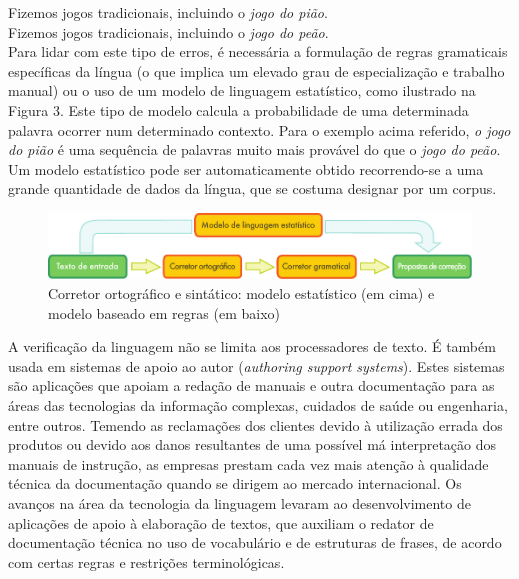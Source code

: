 \begin{multicols}{2}
Fizemos jogos tradicionais, incluindo o \textit{jogo do pião}.\\
Fizemos jogos tradicionais, incluindo o \textit{jogo do peão}.\\

Para lidar com este tipo de erros, é necessária a formulação de regras gramaticais específicas da língua (o que implica um elevado grau de especialização e trabalho manual) ou o uso de um modelo de linguagem estatístico, como ilustrado na Figura 3. Este tipo de modelo calcula a probabilidade de uma determinada palavra ocorrer num determinado contexto. 
Para o exemplo acima referido, \textit{o jogo do pião} é uma sequência de palavras muito mais provável do que o \textit{jogo do peão}. Um mo\-de\-lo estatístico pode ser automaticamente obtido recorrendo-se a uma grande quantidade de dados da língua, que se costuma designar por um corpus.

\begin{figure}[htb]
  \center
  \includegraphics[width=\textwidth]{../_media/portuguese/language_checking}
  \caption{Corretor ortográfico e sintático: modelo estatístico (em cima) e modelo baseado em regras (em baixo)}
  \label{fig:langcheckingaarch_de}
\end{figure}

A verificação da linguagem não se limita aos processadores de texto. 
É também usada em sistemas de apoio ao autor (\textit{authoring support systems}).
Estes sistemas são aplicações que apoiam a redação
de manuais e outra documentação para as áreas das tecnologias da informação complexas, cuidados de saúde ou
engenharia, entre outros.
Temendo as reclamações dos clientes devido à utilização errada dos produtos ou devido aos danos resultantes de uma possível má interpretação dos manuais de instrução, as empresas prestam cada vez mais atenção à qualidade técnica da documentação quando se dirigem ao mercado internacional. 
Os avanços na área da tecnologia da linguagem levaram ao desenvolvimento de aplicações de apoio à elaboração
de textos, que auxiliam o redator de documentação técnica no uso de vocabulário e de estruturas de frases, de acordo com certas regras e restrições terminológicas.


\end{multicols}

